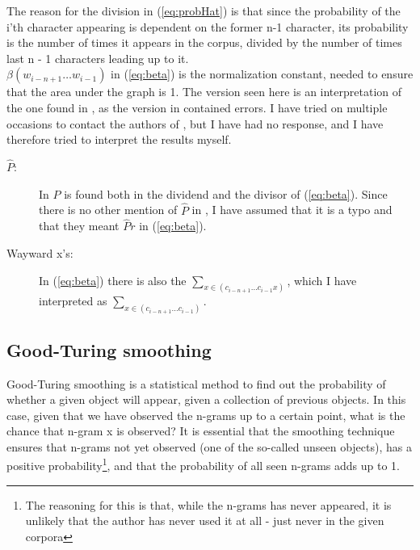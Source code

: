The reason for the division in (\ref{eq:probHat}) is that since the probability of the i'th character appearing is dependent on the former n-1 character, its probability is the number of times it appears in the corpus, divided by the number of times last n - 1 characters leading up to it.\\

$\beta (w_{i - n + 1}\ldots w_{i -1})$ in (\ref{eq:beta}) is the normalization constant, needed to ensure that the area under the graph is 1. The version seen here is an interpretation of the one found in \cite{nr4}, as the version in \cite{nr4} contained errors. I have tried on multiple occasions to contact the authors of \cite{nr4}, but I have had no response, and I have therefore tried to interpret the results myself.
\begin{description}
\item[$\hat{P}$:]  In \cite{nr4} $\hat{P}$ is found  both in the dividend and the divisor of (\ref{eq:beta}). Since there is no other mention of  $\hat{P}$ in \cite{nr4}, I have assumed that it is a typo and that they meant $\hat{P}r$ in (\ref{eq:beta}).
\item[Wayward x's:] In (\ref{eq:beta}) there is also the $\sum_{x \in (c_{i - n + 1} \ldots c_{i-1} x)}$, which I have interpreted as $\sum_{x \in (c_{i - n + 1} \ldots c_{i-1})}$.  
\end{description}

\subsection{Good-Turing smoothing}
\label{Good-Turing}
Good-Turing smoothing is a statistical method to find out the probability of whether a given object will appear, given a collection of previous objects. In this case, given that we have observed the n-grams up to a certain point, what is the chance that n-gram x is observed? It is essential that the smoothing technique ensures that n-grams not yet observed (one of the so-called unseen objects), has a positive probability\footnote{The reasoning for this is that, while the n-grams has never appeared, it is unlikely that the author has never used it at all - just never in the given corpora}, and that the probability of all seen n-grams adds up to 1.\\

